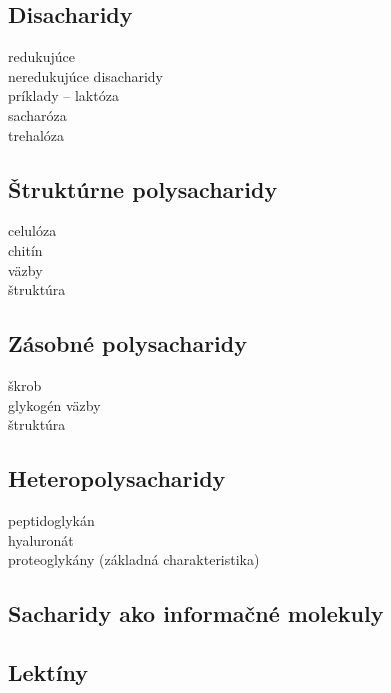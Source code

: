 \subsection*{Disacharidy}
\tab redukujúce\\
\tab neredukujúce disacharidy\\
\tab príklady -- laktóza\\
\tab sacharóza\\
\tab trehalóza\\
\subsection*{Štruktúrne polysacharidy}
\tab celulóza\\
\tab chitín\\
\tab \tab väzby\\
\tab \tab štruktúra\\
\subsection*{Zásobné polysacharidy}
\tab škrob\\
\tab glykogén
\tab \tab väzby\\
\tab \tab štruktúra\\
\subsection*{Heteropolysacharidy}
\tab peptidoglykán\\
\tab hyaluronát\\
\tab proteoglykány (základná charakteristika)\\
\subsection*{Sacharidy ako informačné molekuly}
\subsection*{Lektíny}



